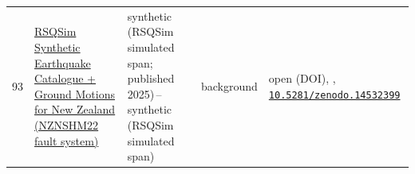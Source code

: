 \documentclass[10pt,a4paper]{article}
\begin{document}
\begin{small}
\begin{longtable}{@{}r L{4.5cm} L{1.9cm} L{1.6cm} L{5.7cm}@{}}
93 & \hyperlink{c:93}{RSQSim Synthetic Earthquake Catalogue + Ground Motions for New Zealand (NZNSHM22 fault system)} & synthetic (RSQSim simulated span; published 2025)\,--\,synthetic (RSQSim simulated span) & background & open (DOI), \cite{Shaw2025}, {\footnotesize \href{https://doi.org/10.5281/zenodo.14532399}{\nolinkurl{10.5281/zenodo.14532399}}} \\
\end{longtable}
\end{small}



\end{document}

